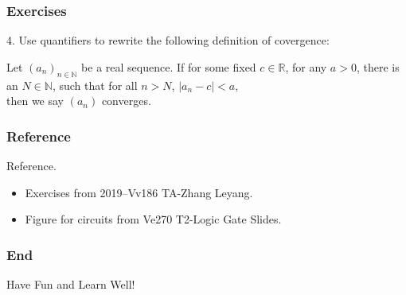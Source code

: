 \documentclass[12pt, t]{beamer}
\begin{document}
\begin{frame}
    \frametitle{Exercises}
    4. Use quantifiers to rewrite the following definition of covergence:
    \par \vspace{2em} \hspace{1em} Let $(a_n)_{n\in \mathbb{N}}$ be a real sequence. If for some fixed $c \in \mathbb{R}$,
    for any $a>0$, there is an $N\in \mathbb{N}$, such that for all $n>N$, $|a_n-c|<a$,\\ then we
    say $(a_n)$ converges.
\end{frame}

\begin{frame}
    \frametitle{Reference}
    Reference.
    \begin{itemize}
        \item Exercises from 2019--Vv186 TA-Zhang Leyang.
        \item Figure for circuits from Ve270 T2-Logic Gate Slides.
    \end{itemize}
\end{frame}

\begin{frame}
    \frametitle{End}
    \vspace{2cm}
    \Huge \center  Have Fun and Learn Well!
\end{frame}
\end{document}
